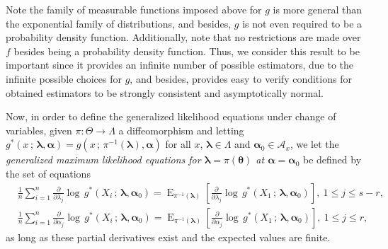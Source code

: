 \documentclass[10pt,a4paper,onecolumn]{article} %
\newcommand{\bs}{\boldsymbol}
\newcommand{\on}{\operatorname}
\begin{document}
Note the family of measurable functions imposed above for $g$ is more general than the exponential family of distributions, and besides, $g$ is not even required to be a probability density function.
 Additionally, note that no restrictions are made over $f$ besides being a probability density function. Thus, we consider this result to be important since it provides an infinite number of possible estimators, due to the infinite possible choices for $g$, and besides, provides easy to verify conditions for obtained estimators to be strongly consistent and asymptotically normal.

Now, in order to define the generalized likelihood equations under change of variables, given $\pi:\Theta\to \Lambda$ a diffeomorphism and letting $g^*(x\,;\, \bs{\lambda},\bs{\alpha})=g(x\,;\, \pi^{-1}(\bs{\lambda}),\bs{\alpha})$ for all $x$, $\bs{\lambda}\in \Lambda$ and $\bs{\alpha}_0\in \mathcal{A}_x$, we let the \textit{generalized maximum likelihood equations for $\bs{\lambda}=\pi(\bs{\theta})$ at $\bs{\alpha}=\bs{\alpha}_0$} be defined by the set of equations
\begin{equation}\label{modified2}
\begin{aligned}
&\frac{1}{n}\sum_{i=1}^n \frac{\partial}{\partial \lambda_j}  \log\, g^*(X_i\,;\,\bs{\lambda},\bs{\alpha}_0) = \on{E}_{\pi^{-1}(\bs{\lambda})}\left[\frac{\partial}{\partial \lambda_j}  \log\, g^*(X_1\,;\,\bs{\lambda},\bs{\alpha}_0)\right],\ 1\leq j\leq s-r,\\ &\frac{1}{n}
\sum_{i=1}^n \frac{\partial}{\partial \alpha_j}  \log\, g^*(X_i\,;\,\bs{\lambda},\bs{\alpha}_0)=\on{E}_{\pi^{-1}(\bs{\lambda})}\left[\frac{\partial}{\partial \alpha_j}  \log\, g^*(X_1\,;\,\bs{\lambda},\bs{\alpha}_0)\right], \  1\leq j\leq r,
\end{aligned}
\end{equation}
as long as these partial derivatives exist and the expected values are finite.
\end{document}
